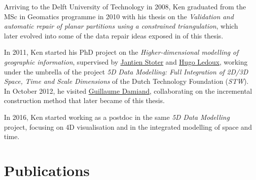Arriving to the Delft University of Technology in 2008, Ken graduated from the MSc in Geomatics programme in 2010 with his thesis on the \emph{Validation and automatic repair of planar partitions using a constrained triangulation}, which later evolved into some of the data repair ideas exposed in  of this thesis.

In 2011, Ken started his PhD project on the \emph{Higher-dimensional modelling of geographic information}, supervised by \href{https://3d.bk.tudelft.nl/jstoter/}{Jantien Stoter} and \href{http://tudelft.nl/hledoux}{Hugo Ledoux}, working under the umbrella of the project \emph{5D Data Modelling: Full Integration of 2D/3D Space, Time and Scale Dimensions} of the Dutch Technology Foundation (\emph{STW}).
In October 2012, he visited \href{http://liris.cnrs.fr/guillaume.damiand/}{Guillaume Damiand}, collaborating on the incremental construction method that later became  of this thesis.

In 2016, Ken started working as a postdoc in the same \emph{5D Data Modelling} project, focusing on 4D visualisation and in the integrated modelling of space and time.

\clearpage
\section*{Publications}

{\small
\begin{itemize}
\papermethodsxvoxelisation%
\paperijgisroeland%
\paperudmvobj%
\paperisprsnd%
\paperijgind{}%
\paperijgisextrusion{}%
\paperijgisndstructures{}%
\papercgeoprepair{}%
\papericaaincrementalconstruction{}%
\paperacmsigspatialextrusion%
\clearpage%
\papericcsand%
\papergeoadvancesnd{}%
\paperagileslicing%
\paperpfgpprepair{}%
\paperosgisrepair%
\papertdgeoinfond%
\paperagileprepair%
\paperostravaedgematching%
\end{itemize}
}

